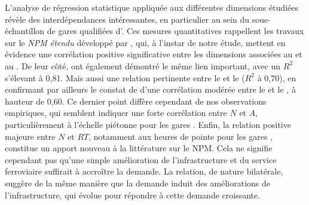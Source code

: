 \begin{refsegment}
L’analyse de régression statistique appliquée aux différentes dimensions étudiées révèle des interdépendances intéressantes, en particulier au sein du sous-échantillon de gares qualifiées d'. Ces mesures quantitatives rappellent les travaux sur le \textit{NPM étendu} développé par \textcolor{blue}{\textcite[289]{vale_extended_2018}}, qui, à l'instar de notre étude, mettent en évidence une corrélation positive significative entre les dimensions associées au  et au . De leur côté, \textcolor{blue}{\textcite[10]{zhang_network_2019}} ont également démontré le même lien important, avec un \(R^2\) s'élevant à 0,81. Mais aussi une relation pertinente entre le  et le  (\(R^2\) à 0,70), en confirmant par ailleurs le constat de \textcolor{blue}{\textcite[289]{vale_extended_2018}} d’une corrélation modérée entre le  et le , à hauteur de 0,60. Ce dernier point diffère cependant de nos observations empiriques, qui semblent indiquer une forte corrélation entre \(N\) et \(A\), particulièrement à l’échelle piétonne pour les gares  \textcolor{blue}{\autocite[79]{papa_accessibility_2015}}. Enfin, la relation positive majeure entre \(N\) et \(RT\), notamment aux heures de pointe pour les gares , constitue un apport nouveau à la littérature sur le \acrshort{NPM}. Cela ne signifie cependant pas qu’une simple amélioration de l’infrastructure et du service ferroviaire suffirait à accroître la demande. La relation, de nature bilatérale, suggère de la même manière que la demande induit des améliorations de l’infrastructure, qui évolue pour répondre à cette demande croissante.%


\end{refsegment}
